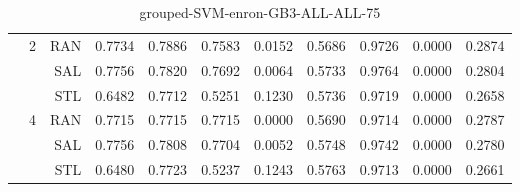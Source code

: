 \begin{center}
\begin{table}[htbp]
\begin{center}
\begin{tabular}{ | r | r | r | r | r | r | r | r | r | r | r |}
 & \multirow{3}{*}{2} & RAN & 0.7734 & 0.7886 & 0.7583 & 0.0152 & 0.5686 & 0.9726 & 0.0000 & 0.2874\\ \cline{3-11}
 &   & SAL & 0.7756 & 0.7820 & 0.7692 & 0.0064 & 0.5733 & 0.9764 & 0.0000 & 0.2804\\ \cline{3-11}
 &   & STL & 0.6482 & 0.7712 & 0.5251 & 0.1230 & 0.5736 & 0.9719 & 0.0000 & 0.2658\\ \cline{2-11}
 & \multirow{3}{*}{4} & RAN & 0.7715 & 0.7715 & 0.7715 & 0.0000 & 0.5690 & 0.9714 & 0.0000 & 0.2787\\ \cline{3-11}
 &   & SAL & 0.7756 & 0.7808 & 0.7704 & 0.0052 & 0.5748 & 0.9742 & 0.0000 & 0.2780\\ \cline{3-11}
 &   & STL & 0.6480 & 0.7723 & 0.5237 & 0.1243 & 0.5763 & 0.9713 & 0.0000 & 0.2661\\ \cline{2-11}
\hline
\end{tabular}
\caption{grouped-SVM-enron-GB3-ALL-ALL-75}
\end{center}
 \end{table}
\end{center}

